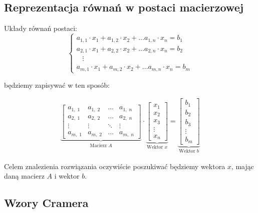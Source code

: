 \subsection{Reprezentacja równań w postaci macierzowej}

Układy równań postaci: 
\[ 
    \begin{cases}
        a_{1,1} \cdot x_1 + a_{1, 2} \cdot x_2 + \dots a_{1,n} \cdot x_n = b_1 \\ 
        a_{2,1} \cdot x_1 + a_{2, 2} \cdot x_2 + \dots a_{2,n} \cdot x_n = b_2 \\
        \hspace{10pt} \vdots \\
        a_{m,1} \cdot x_1 + a_{m, 2} \cdot x_2 + \dots a_{m,n} \cdot x_n = b_m
    \end{cases}
\]

będziemy zapisywać w ten sposób:

\begin{align*}
    \underbrace{
        \begin{bmatrix}
            a_{1, \; 1} & a_{1, \; 2} & \dots & a_{1,\; n}\\
            a_{2, \; 1} & a_{2, \; 2} & \dots & a_{2,\; n} \\ 
            \vdots & \vdots & \ddots & \vdots \\ 
            a_{m, \; 1} & a_{m, \; 2} & \dots & a_{m, \; n}
        \end{bmatrix}
    }_{\text{Macierz \(A\)}}
    \cdot
    \underbrace{
        \begin{bmatrix}
            x_1 \\ x_2 \\ x_3 \\ \vdots \\ x_n
        \end{bmatrix}
    }_{\text{Wektor \(x\)}}
    = 
    \underbrace{
    \begin{bmatrix}
        b_1 \\ b_2 \\ b_3 \\ \vdots \\ b_m
    \end{bmatrix}
    }_{\text{Wektor \(b\)}}
\end{align*}

Celem znalezienia rozwiązania oczywiście poszukiwać będziemy wektora \(x\), mając daną macierz \(A\) i wektor \(b\).

\subsection{Wzory Cramera}

